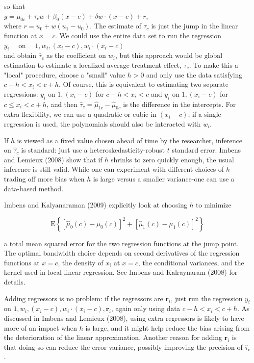 \documentclass[10pt]{article}
\begin{document}
so that\\
$y=\mu_{0 c}+\tau_{c} w+\beta_{0}(x-c)+\delta w \cdot(x-c)+r$,\\
where $r=u_{0}+w\left(u_{1}-u_{0}\right)$. The estimate of $\tau_{c}$ is just the jump in the linear function at $x=c$. We could use the entire data set to run the regression\\
$y_{i} \quad$ on $\quad 1, w_{i},\left(x_{i}-c\right), w_{i} \cdot\left(x_{i}-c\right)$\\
and obtain $\hat{\tau}_{c}$ as the coefficient on $w_{i}$, but this approach would be global estimation to estimate a localized average treatment effect, $\tau_{c}$. To make this a "local" procedure, choose a "small" value $h>0$ and only use the data satisfying $c-h<x_{i}<c+h$. Of course, this is equivalent to estimating two separate regressions: $y_{i}$ on $1,\left(x_{i}-c\right)$ for $c-h<x_{i}<c$ and $y_{i}$ on $1,\left(x_{i}-c\right)$ for $c \leq x_{i}<c+h$, and then $\hat{\tau}_{c}=\hat{\mu}_{1 c}-\hat{\mu}_{0 c}$ is the difference in the intercepts. For extra flexibility, we can use a quadratic or cubic in $\left(x_{i}-c\right)$; if a single regression is used, the polynomials should also be interacted with $w_{i}$.

If $h$ is viewed as a fixed value chosen ahead of time by the researcher, inference on $\hat{\tau}_{c}$ is standard: just use a heteroskedasticity-robust $t$ standard error. Imbens and Lemieux (2008) show that if $h$ shrinks to zero quickly enough, the usual inference is still valid. While one can experiment with different choices of $h$-trading off more bias when $h$ is large versus a smaller variance-one can use a data-based method.

Imbens and Kalyanaraman (2009) explicitly look at choosing $h$ to minimize


\begin{equation*}
\mathrm{E}\left\{\left[\hat{\mu}_{0}(c)-\mu_{0}(c)\right]^{2}+\left[\hat{\mu}_{1}(c)-\mu_{1}(c)\right]^{2}\right\} \tag{21.103}
\end{equation*}


a total mean squared error for the two regression functions at the jump point. The optimal bandwidth choice depends on second derivatives of the regression functions at $x=c$, the density of $x_{i}$ at $x=c$, the conditional variances, and the kernel used in local linear regression. See Imbens and Kalraynaram (2008) for details.

Adding regressors is no problem: if the regressors are $\mathbf{r}_{i}$, just run the regression $y_{i}$ on $1, w_{i},\left(x_{i}-c\right), w_{i} \cdot\left(x_{i}-c\right), \mathbf{r}_{i}$, again only using data $c-h<x_{i}<c+h$. As discussed in Imbens and Lemieux (2008), using extra regressors is likely to have more of an impact when $h$ is large, and it might help reduce the bias arising from the deterioration of the linear approximation. Another reason for adding $\mathbf{r}_{i}$ is that doing so can reduce the error variance, possibly improving the precision of $\hat{\tau}_{c}$.
\end{document}
